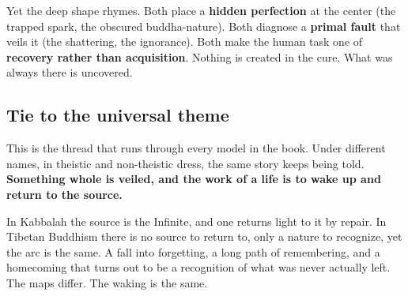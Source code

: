 Yet the deep shape rhymes. Both place a \textbf{hidden perfection} at the center (the trapped spark, the obscured buddha-nature). Both diagnose a \textbf{primal fault} that veils it (the shattering, the ignorance). Both make the human task one of \textbf{recovery rather than acquisition}. Nothing is created in the cure. What was always there is uncovered.

\subsection{Tie to the universal theme}

This is the thread that runs through every model in the book. Under different names, in theistic and non-theistic dress, the same story keeps being told. \textbf{Something whole is veiled, and the work of a life is to wake up and return to the source.}

In Kabbalah the source is the Infinite, and one returns light to it by repair. In Tibetan Buddhism there is no source to return to, only a nature to recognize, yet the arc is the same. A fall into forgetting, a long path of remembering, and a homecoming that turns out to be a recognition of what was never actually left. The maps differ. The waking is the same.
